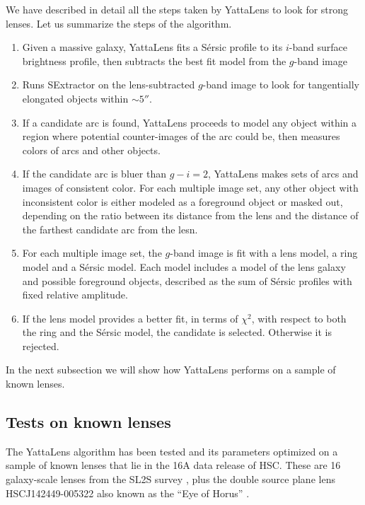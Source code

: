 \documentclass[a4paper,fleqn,usenatbib]{mnras}
\begin{document}
We have described in detail all the steps taken by YattaLens to look for strong lenses. Let us summarize the steps of the algorithm. 
\begin{enumerate}
\item Given a massive galaxy, YattaLens fits a S\'{e}rsic profile to its $i$-band surface brightness profile, then subtracts the best fit model from the $g$-band image 
\item Runs SExtractor on the lens-subtracted $g$-band image to look for tangentially elongated objects within $\sim5''$. 
\item If a candidate arc is found, YattaLens proceeds to model any object within a region where potential counter-images of the arc could be, then measures colors of arcs and other objects.
\item If the candidate arc is bluer than $g-i=2$, YattaLens makes sets of arcs and images of consistent color. For each multiple image set, any other object with inconsistent color is either modeled as a foreground object or masked out, depending on the ratio between its distance from the lens and the distance of the farthest candidate arc from the lesn.
\item For each multiple image set, the $g$-band image is fit with a lens model, a ring model and a S\'{e}rsic model. Each model includes a model of the lens galaxy and possible foreground objects, described as the sum of S\'{e}rsic profiles with fixed relative amplitude.
\item If the lens model provides a better fit, in terms of $\chi^2$, with respect to both the ring and the S\'{e}rsic model, the candidate is selected. Otherwise it is rejected.
\end{enumerate}
In the next subsection we will show how YattaLens performs on a sample of known lenses.

\subsection{Tests on known lenses}

The YattaLens algorithm has been tested and its parameters optimized on a sample of known lenses that lie in the 16A data release of HSC. These are 16 galaxy-scale lenses from the SL2S survey \citep[][SL2SJ021247-055552, SL2SJ021411-040502, SL2SJ021737-051329, SL2SJ022357-065142, SL2SJ022511-045433, SL2SJ022610-042011, SL2SJ022648-040610, SL2SJ022708-065445, SL2SJ023251-040823, SL2SJ023307-043838, SL2SJ090407-005952, SL2SJ142003+523137, SL2SJ220329+020518, SL2SJ220506+014703, SL2SJ221326-000946, SL2SJ222148+011542]{Gav++12, Son++13a, Son++15}, plus the double source plane lens HSCJ142449-005322 also known as the ``Eye of Horus'' \citep{Tan++16}.
\end{document}
